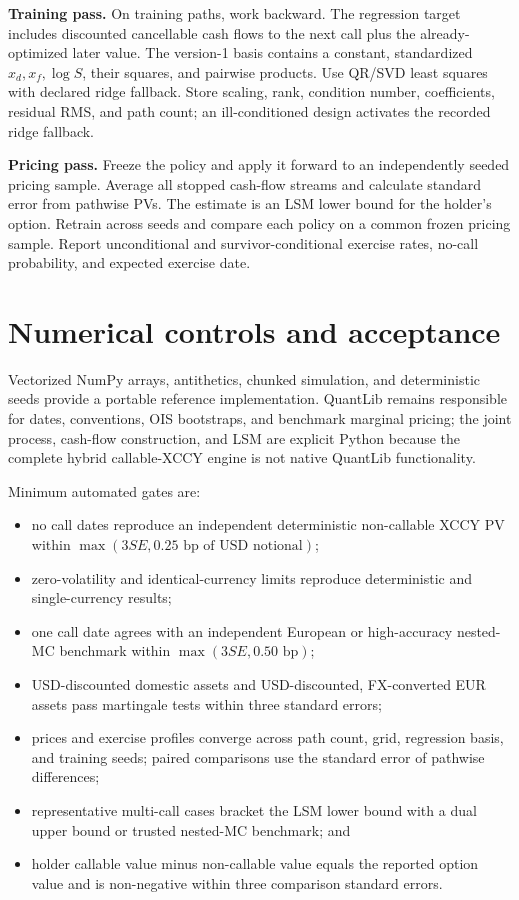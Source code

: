 \documentclass[conference]{IEEEtran}
\begin{document}
\textbf{Training pass.} On training paths, work backward. The regression target includes discounted cancellable cash flows to the next call plus the already-optimized later value. The version-1 basis contains a constant, standardized $x_d,x_f,\log S$, their squares, and pairwise products. Use QR/SVD least squares with declared ridge fallback. Store scaling, rank, condition number, coefficients, residual RMS, and path count; an ill-conditioned design activates the recorded ridge fallback.

\textbf{Pricing pass.} Freeze the policy and apply it forward to an independently seeded pricing sample. Average all stopped cash-flow streams and calculate standard error from pathwise PVs. The estimate is an LSM lower bound for the holder's option. Retrain across seeds and compare each policy on a common frozen pricing sample. Report unconditional and survivor-conditional exercise rates, no-call probability, and expected exercise date.

\section{Numerical controls and acceptance}

Vectorized NumPy arrays, antithetics, chunked simulation, and deterministic seeds provide a portable reference implementation. QuantLib remains responsible for dates, conventions, OIS bootstraps, and benchmark marginal pricing; the joint process, cash-flow construction, and LSM are explicit Python because the complete hybrid callable-XCCY engine is not native QuantLib functionality.

Minimum automated gates are:
\begin{itemize}
 \item no call dates reproduce an independent deterministic non-callable XCCY PV within $\max(3SE,0.25\text{ bp of USD notional})$;
 \item zero-volatility and identical-currency limits reproduce deterministic and single-currency results;
 \item one call date agrees with an independent European or high-accuracy nested-MC benchmark within $\max(3SE,0.50\text{ bp})$;
 \item USD-discounted domestic assets and USD-discounted, FX-converted EUR assets pass martingale tests within three standard errors;
 \item prices and exercise profiles converge across path count, grid, regression basis, and training seeds; paired comparisons use the standard error of pathwise differences;
 \item representative multi-call cases bracket the LSM lower bound with a dual upper bound or trusted nested-MC benchmark; and
 \item holder callable value minus non-callable value equals the reported option value and is non-negative within three comparison standard errors.
\end{itemize}
\end{document}

